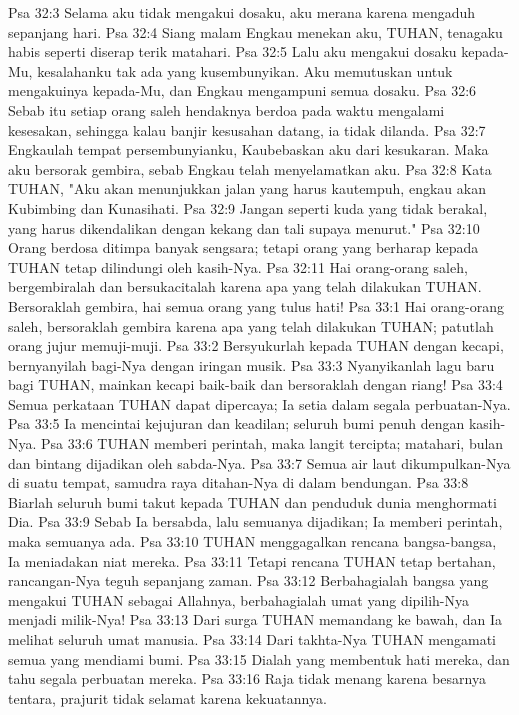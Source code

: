 Psa 32:3  Selama aku tidak mengakui dosaku, aku merana karena mengaduh sepanjang hari.
Psa 32:4  Siang malam Engkau menekan aku, TUHAN, tenagaku habis seperti diserap terik matahari.
Psa 32:5  Lalu aku mengakui dosaku kepada-Mu, kesalahanku tak ada yang kusembunyikan. Aku memutuskan untuk mengakuinya kepada-Mu, dan Engkau mengampuni semua dosaku.
Psa 32:6  Sebab itu setiap orang saleh hendaknya berdoa pada waktu mengalami kesesakan, sehingga kalau banjir kesusahan datang, ia tidak dilanda.
Psa 32:7  Engkaulah tempat persembunyianku, Kaubebaskan aku dari kesukaran. Maka aku bersorak gembira, sebab Engkau telah menyelamatkan aku.
Psa 32:8  Kata TUHAN, "Aku akan menunjukkan jalan yang harus kautempuh, engkau akan Kubimbing dan Kunasihati.
Psa 32:9  Jangan seperti kuda yang tidak berakal, yang harus dikendalikan dengan kekang dan tali supaya menurut."
Psa 32:10  Orang berdosa ditimpa banyak sengsara; tetapi orang yang berharap kepada TUHAN tetap dilindungi oleh kasih-Nya.
Psa 32:11  Hai orang-orang saleh, bergembiralah dan bersukacitalah karena apa yang telah dilakukan TUHAN. Bersoraklah gembira, hai semua orang yang tulus hati!
Psa 33:1  Hai orang-orang saleh, bersoraklah gembira karena apa yang telah dilakukan TUHAN; patutlah orang jujur memuji-muji.
Psa 33:2  Bersyukurlah kepada TUHAN dengan kecapi, bernyanyilah bagi-Nya dengan iringan musik.
Psa 33:3  Nyanyikanlah lagu baru bagi TUHAN, mainkan kecapi baik-baik dan bersoraklah dengan riang!
Psa 33:4  Semua perkataan TUHAN dapat dipercaya; Ia setia dalam segala perbuatan-Nya.
Psa 33:5  Ia mencintai kejujuran dan keadilan; seluruh bumi penuh dengan kasih-Nya.
Psa 33:6  TUHAN memberi perintah, maka langit tercipta; matahari, bulan dan bintang dijadikan oleh sabda-Nya.
Psa 33:7  Semua air laut dikumpulkan-Nya di suatu tempat, samudra raya ditahan-Nya di dalam bendungan.
Psa 33:8  Biarlah seluruh bumi takut kepada TUHAN dan penduduk dunia menghormati Dia.
Psa 33:9  Sebab Ia bersabda, lalu semuanya dijadikan; Ia memberi perintah, maka semuanya ada.
Psa 33:10  TUHAN menggagalkan rencana bangsa-bangsa, Ia meniadakan niat mereka.
Psa 33:11  Tetapi rencana TUHAN tetap bertahan, rancangan-Nya teguh sepanjang zaman.
Psa 33:12  Berbahagialah bangsa yang mengakui TUHAN sebagai Allahnya, berbahagialah umat yang dipilih-Nya menjadi milik-Nya!
Psa 33:13  Dari surga TUHAN memandang ke bawah, dan Ia melihat seluruh umat manusia.
Psa 33:14  Dari takhta-Nya TUHAN mengamati semua yang mendiami bumi.
Psa 33:15  Dialah yang membentuk hati mereka, dan tahu segala perbuatan mereka.
Psa 33:16  Raja tidak menang karena besarnya tentara, prajurit tidak selamat karena kekuatannya.
